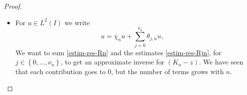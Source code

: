 \documentclass[11pt]{article}
\numberwithin{equation}{section}
\let\mathcal\mathscr
\newcommand{\Psfrac}[2]{(\sfrac{#1}{#2})}
\theoremstyle{plain}
\theoremstyle{definition}
\newcommand {\limt}[2]{\xrightarrow[#1 \to #2]{}}
\newcommand{\abs}[1]{\vert #1\vert}
\newcommand{\nr}[1]{\Vert #1\Vert}
\newcommand{\Ii}[2] {\left\{ #1,\dots,#2 \right\}}
\newcommand{\inv}{^{-1}}
\newcommand{\1}{\mathds 1}
\let\Re\relax
\DeclareMathOperator{\Re}{\mathsf{Re}\mkern2mu}
\def\C{\mathbb{C}}
\newcommand{\N}{\mathbb{N}}
\let\g\gamma
\let\th\theta
\let\h\chi
\newcommand{\Lc}{{\mathcal L}}
\begin{document}
\begin{proof}
\begin{itemize}
For $j \in \Ii 1 {\nu_n-1}$ we set $\1_j = \1_I$. We also denote by $\1_0$ the operator which maps $u \in L^2(-\ell_-,+\infty)$ to its restriction on $I$, and by $\1_{\nu_n}$ the operator which maps $u \in L^2(-\infty,\ell_+)$ to its restriction to $I$. For $z \in \C_n^-$ we set
\begin{align*}
R_{j,n}(z) &= \1_j \bigl(A_{j,n}-z \bigr)\inv \1_j^*
\\
\tag*{and}
T_{j,n}(z) &= R_{j,n}(z) \theta_{j,n} (K_n-z) - \theta_{j,n}.
\end{align*}
We proceed as above. For $j \in \Ii 0 {\nu_n}$ we have
\begin{equation*}
R_{j,n}(z) \theta_{j,n} (K_n-z)u = \theta_{j,n} u+ i n R_{j,n}(z) \theta_{j,n} r_{j,n} u - R_{j,n}(z) \th_{j,n}'' u + 2 R_{j,n}(z) \partial_y (\th_{j,n}'u),
\end{equation*}
where
\[
r_{j,n}(y) = q^2(y) - q^2(a_{j,n}) - 2\, (y-a_{j,n}) q'(a_{j,n}) q(a_{j,n}).
\]
Let $n \in \N^*$ and $j \in \Ii 0 {\nu_n}$ such that $\theta_{j,n} \neq 0$. Then we have $2n q'(a_{j,n}) \vert q(a_{j,n})\vert \gtrsim n^{1-\rho}$ and hence, for $z \in \C_n^-$ (in particular $\Re(z) \leq \g n^{\sfrac 12} \ll n^{\Psfrac 23(1-\rho)}$), Proposition~\ref{prop-Airy-R+} gives
\begin{equation} \label{estim-res-Ajn}
\nr{R_{j,n}(z)}_{\Lc(L^2(I))} \lesssim n^{-\Psfrac 23(1-\rho)}.
\end{equation}
Then, as above we have $\abs{\tilde r_{j,n}(y) \theta_{j,n}(y)} \lesssim n^{-2\tilde \rho}$ so
\[
n \nr{ R_{j,n}(z) \tilde r_{j,n} \theta_{j,n}}_{\Lc(L^2(I))} \lesssim n^{1-2\tilde \rho - \Psfrac 23(1-\rho)} \limt n {+\infty} 0.
\]
Moreover,
\begin{align*}
\nr{R_{j,n}(z) \th_{j,n}'' u }_{L^2(I)} &\lesssim n^{2\tilde \rho - \Psfrac 23 (1-\rho)} \nr{u}_{L^2(I)},\\
\nr{R_{j,n}(z) (\th'_{j,n} u)'}_{L^2(I)} &\lesssim n^{\tilde \rho - \Psfrac 13(1-\rho)} \nr{u}_{L^2(I)}.
\end{align*}
All these estimates being uniform with respect to $j \in \Ii 0 {\nu_n}$, we finally get
\begin{equation} \label{estim-res-Rjn}
\sup_{z \in \C_n^-} \sup_{0\leq j \leq \nu_n} \nr{T_{j,n}(z)}_{\Lc(L^2(I))} \limt n {+\infty} 0.
\end{equation}

\item
For $u \in L^2(I)$ we write
\[
u = \h_n u + \sum_{j=0}^{\nu_n} \th_{j,n} u,
\]
We want to sum \eqref{estim-res-Rn} and the estimates \eqref{estim-res-Rjn}, for $j \in \Ii 0 {\nu_n}$, to get an approximate inverse for $(K_n-z)$. We have seen that each contribution goes to 0, but the number of terms grows with $n$.


\end{itemize}
\end{proof}
\end{document}

